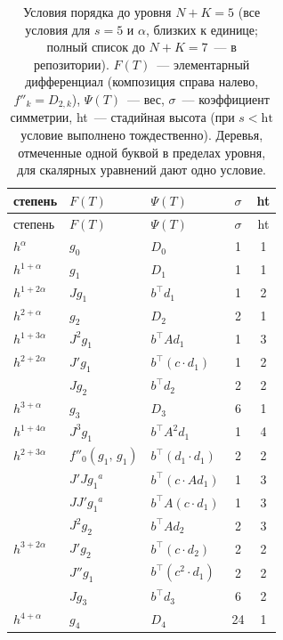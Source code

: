 {\small
\begin{longtable}{lllcc}
\caption{Условия порядка до уровня $N+K=5$ (все условия для $s=5$ и $\alpha$, близких к единице; полный список до $N+K=7$~--- в репозитории). $F(T)$~--- элементарный дифференциал (композиция справа налево, $f''_k=D_{2,k}$), $\Psi(T)$~--- вес, $\sigma$~--- коэффициент симметрии, ht~--- стадийная высота (при $s<\mathrm{ht}$ условие выполнено тождественно). Деревья, отмеченные одной буквой в пределах уровня, для скалярных уравнений дают одно условие.}\label{tab:S}\\
\toprule
степень & $F(T)$ & $\Psi(T)$ & $\sigma$ & ht\\
\midrule
\endfirsthead
\toprule
степень & $F(T)$ & $\Psi(T)$ & $\sigma$ & ht\\
\midrule
\endhead
$h^{\alpha}$ & $g_0$ & $D_0$ & 1 & 1\\
\midrule
$h^{1+\alpha}$ & $g_{1}$ & $D_{1}$ & 1 & 1\\
\midrule
$h^{1+2\alpha}$ & $Jg_{1}$ & $b^{\top}d_{1}$ & 1 & 2\\
\midrule
$h^{2+\alpha}$ & $g_{2}$ & $D_{2}$ & 2 & 1\\
\midrule
$h^{1+3\alpha}$ & $J^{2}g_{1}$ & $b^{\top}Ad_{1}$ & 1 & 3\\
\midrule
$h^{2+2\alpha}$ & $J'g_{1}$ & $b^{\top}(c\cdot d_{1})$ & 1 & 2\\
 & $Jg_{2}$ & $b^{\top}d_{2}$ & 2 & 2\\
\midrule
$h^{3+\alpha}$ & $g_{3}$ & $D_{3}$ & 6 & 1\\
\midrule
$h^{1+4\alpha}$ & $J^{3}g_{1}$ & $b^{\top}A^{2}d_{1}$ & 1 & 4\\
\midrule
$h^{2+3\alpha}$ & $f''_{0}(g_{1},\,g_{1})$ & $b^{\top}(d_{1}\cdot d_{1})$ & 2 & 2\\
 & $J'Jg_{1}$$^{a}$ & $b^{\top}(c\cdot Ad_{1})$ & 1 & 3\\
 & $JJ'g_{1}$$^{a}$ & $b^{\top}A(c\cdot d_{1})$ & 1 & 3\\
 & $J^{2}g_{2}$ & $b^{\top}Ad_{2}$ & 2 & 3\\
\midrule
$h^{3+2\alpha}$ & $J'g_{2}$ & $b^{\top}(c\cdot d_{2})$ & 2 & 2\\
 & $J''g_{1}$ & $b^{\top}(c^{2}\cdot d_{1})$ & 2 & 2\\
 & $Jg_{3}$ & $b^{\top}d_{3}$ & 6 & 2\\
\midrule
$h^{4+\alpha}$ & $g_{4}$ & $D_{4}$ & 24 & 1\\
\bottomrule
\end{longtable}
}
